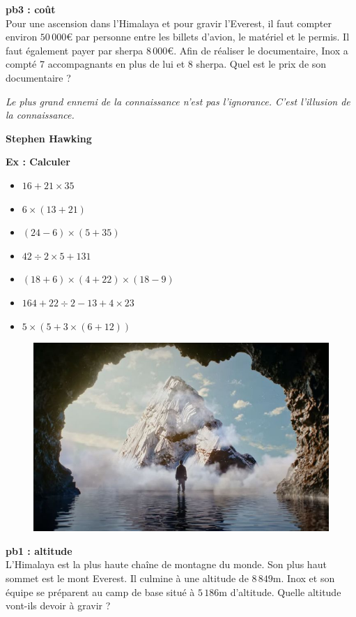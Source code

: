 \textbf{pb3 : coût} \\

Pour une ascension dans l’Himalaya et pour gravir l’Everest, il faut compter environ $50\,000$€ par personne entre les billets d'avion, le matériel et le permis. Il faut également payer par sherpa $8\,000$€. Afin de réaliser le documentaire, Inox a compté 7 accompagnants en plus de lui et 8 sherpa. Quel est le prix de son documentaire ?


\newpage

\begin{center}
  \textit{Le plus grand ennemi de la connaissance n'est pas l'ignorance. C'est l'illusion de la connaissance.} 
  
  \textbf{Stephen Hawking}
\end{center}

\textbf{Ex : Calculer} 

\begin{multicols}{2} \begin{itemize}[label={$\bullet$}]
  \item $16 + 21 \times 35$ 
  \item $6 \times (13 + 21)$ 
  \item $(24 - 6) \times (5 + 35)$
  \item $42 \div 2 \times 5 + 131$
  \item $(18 + 6) \times (4 + 22) \times (18 - 9)$
  \item $164 + 22 \div 2 - 13 + 4 \times 23$
  \item $5 \times ( 5 + 3 \times (6 + 12))$
\end{itemize} \end{multicols}


\begin{figure}[H]
  \centering
  \includegraphics[width=0.4\linewidth]{5x1-calcul-numerique/kaizen.jpg}
\end{figure}

\textbf{pb1 : altitude} \\

L'Himalaya est la plus haute chaîne de montagne du monde. Son plus haut sommet est le mont Everest. Il culmine à une altitude de $8\,849$m. Inox et son équipe se préparent au camp de base situé à $5\,186$m d'altitude. Quelle altitude vont-ils devoir à gravir ? \\


